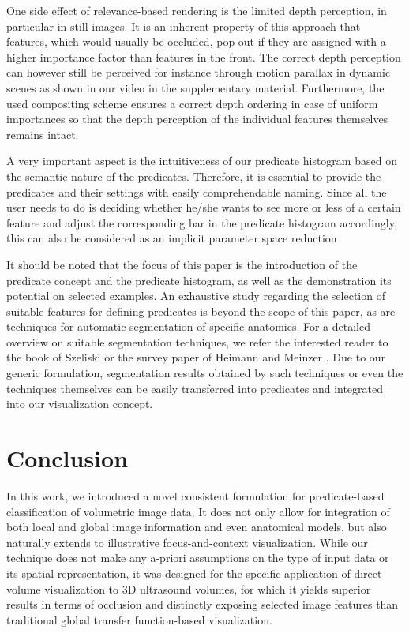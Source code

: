 One side effect of relevance-based rendering is the limited depth perception, in particular in still images. 
It is an inherent property of this approach that features, which would usually be occluded, pop out if they are assigned with a higher importance factor than features in the front. 
The correct depth perception can however still be perceived for instance through motion parallax in dynamic scenes as shown in our video in the supplementary material.
Furthermore, the used compositing scheme \cite{Pinto10} ensures a correct depth ordering in case of uniform importances so that the depth perception of the individual features themselves remains intact.


A very important aspect is the intuitiveness of our predicate histogram based on the semantic nature of the predicates.
Therefore, it is essential to provide the predicates and their settings with easily comprehendable naming.
Since all the user needs to do is deciding whether he/she wants to see more or less of a certain feature and adjust the corresponding bar in the predicate histogram accordingly, this can also be considered as an implicit parameter space reduction

It should be noted that the focus of this paper is the introduction of the predicate concept and the predicate histogram, as well as the demonstration its potential on selected examples. 
An exhaustive study regarding the selection of suitable features for defining predicates is beyond the scope of this paper, as are techniques for automatic segmentation of specific anatomies. 
For a detailed overview on suitable segmentation techniques, we refer the interested reader to the book of Szeliski \cite{Szeliski10} or the survey paper of Heimann and Meinzer \cite{Heimann09}. 
Due to our generic formulation, segmentation results obtained by such techniques or even the techniques themselves can be easily transferred into predicates and integrated into our visualization concept.

\section*{Conclusion}
In this work, we introduced a novel consistent formulation for predicate-based classification of volumetric image data. 
It does not only allow for integration of both local and global image information and even anatomical models, but also naturally extends to illustrative focus-and-context visualization. 
While our technique does not make any a-priori assumptions on the type of input data or its spatial representation, it was designed for the specific application of direct volume visualization to 3D ultrasound volumes, for which it yields superior results in terms of occlusion and distinctly exposing selected image features than traditional global transfer function-based visualization. 

